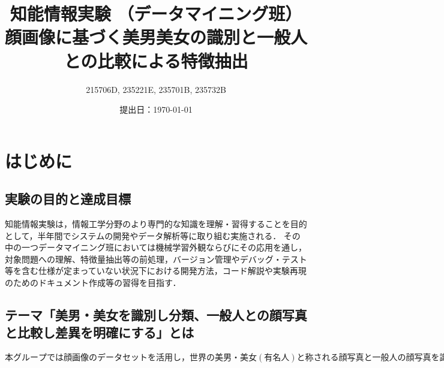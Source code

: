 \documentclass[a4paper,11pt,titlepage]{jsarticle}
\begin{document}
\title{知能情報実験 （データマイニング班）\\顔画像に基づく美男美女の識別と一般人との比較による特徴抽出}
\author{ 215706D, 235221E, 235701B, 235732B}
\date{提出日：\today}
\maketitle

\tableofcontents
\clearpage

\begin{abstract}
\end{abstract} 


\section{はじめに}
\subsection{実験の目的と達成目標}
知能情報実験は，情報工学分野のより専門的な知識を理解・習得することを目的として，半年間でシステムの開発やデータ解析等に取り組む実施される．
その中の一つデータマイニング班においては機械学習外観ならびにその応用を通し，対象問題への理解、特徴量抽出等の前処理，バージョン管理やデバッグ・テスト等を含む仕様が定まっていない状況下における開発方法，コード解説や実験再現のためのドキュメント作成等の習得を目指す．


\subsection{テーマ「美男・美女を識別し分類、一般人との顔写真と比較し差異を明確にする」とは}
\(本グループでは顔画像のデータセットを活用し，世界の美男・美女(有名人)と称される顔写真と一般人の顔写真を識別・分類するモデルの構築を問題として設定した．


本テーマでは，機械学習モデルから有名人の顔に共通する審美的特徴(黄金比に基づく顔の比率や対称性等)を特定し，一般人の顔画像との差異を明確化する．具体的には，顔写真から顔の輪郭や鼻立ち，肌の色調や表情，目等をデータに合わせて前処理を行い，全体データに対してラベルをつけ，カテゴリ化．そして，ResNet34モデルを用いて学習およびテストを行う，
このテーマに取り組む意義として，美しさや魅力等を黄金比や対称性を定量化・可視化でき，美的評価が客観的に認識できる．また，ResNet34モデルが人間の美的感覚に近い判断をどの程度行えるかというデータを明らかにする．
\)
\end{document}
